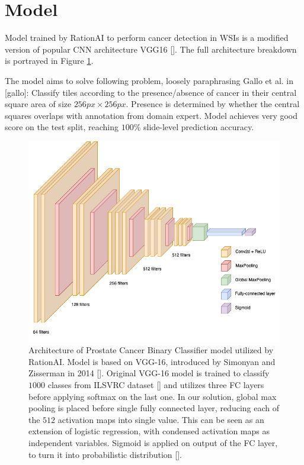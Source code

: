 \section{Model}

Model trained by RationAI to perform cancer detection in WSIs is a modified version of popular CNN architecture VGG16 [].
The full architecture breakdown is portrayed in Figure \ref{fig:rationai-vgg16}.

The model aims to solve following problem, loosely paraphrasing Gallo et al. in [gallo]: Classify tiles according to the presence/absence of cancer in their central square area of size $256 px \times 256 px$. Presence is determined by whether the central squares overlaps with annotation from domain expert. Model achieves very good score on the test split, reaching $100$\% slide-level prediction accuracy.


\begin{figure}
    \begin{center}
    \begin{minipage}{0.75\textwidth}
      \includegraphics[width=\textwidth]{img/nn-arch.png}
    \end{minipage}
    \caption{Architecture of Prostate Cancer Binary Classifier model utilized by RationAI. Model is based on VGG-16, introduced by Simonyan and Zisserman in 2014 []. Original VGG-16 model is trained to classify $1000$ classes from ILSVRC dataset [] and utilizes three FC layers before applying softmax on the last one. In our solution, global max pooling is placed before single fully connected layer, reducing each of the $512$ activation maps into single value. This can be seen as an extension of logistic regression, with condensed activation maps as independent variables. Sigmoid is applied on output of the FC layer, to turn it into probabilistic distribution [].}
    \label{fig:rationai-vgg16}
    \end{center}
\end{figure}

